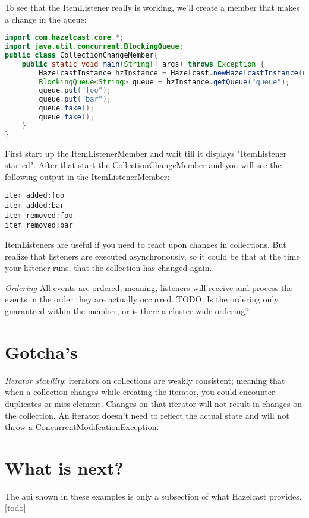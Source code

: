 To see that the ItemListener really is working, we'll create a member that makes a change in the queue:
\begin{lstlisting}[language=java]
import com.hazelcast.core.*;
import java.util.concurrent.BlockingQueue;
public class CollectionChangeMember{
    public static void main(String[] args) throws Exception {
        HazelcastInstance hzInstance = Hazelcast.newHazelcastInstance(null);
        BlockingQueue<String> queue = hzInstance.getQueue("queue");
        queue.put("foo");
        queue.put("bar");
        queue.take();
        queue.take();
    }
}
\end{lstlisting}
First start up the ItemListenerMember and wait till it displays "ItemListener started". After that start the CollectionChangeMember and you will see the following output in the ItemListenerMember:
\begin{lstlisting}
item added:foo
item added:bar
item removed:foo
item removed:bar
\end{lstlisting}
ItemListeners are useful if you need to react upon changes in collections. But realize that listeners are executed asynchronously, so it could be that at the time your listener runs, that the collection has changed again. 

\emph{Ordering} All events are ordered, meaning, listeners will receive and process the events in the order they are actually occurred. TODO: Is the ordering only guaranteed within the member, or is there a cluster wide ordering?

\section{Gotcha's}

\emph{Iterator stability}: iterators on collections are weakly consistent; meaning that when a collection changes while creating the iterator, you could encounter duplicates or miss element. Changes on that iterator will not result in changes on the collection. An iterator doesn't need to reflect the actual state and will not throw a ConcurrentModifcationException. 

\section{What is next?}
The api shown in these examples is only a subsection of what Hazelcast provides.[todo]